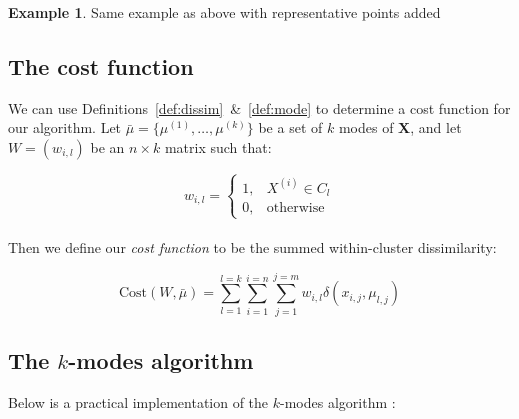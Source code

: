 \documentclass{article}
\theoremstyle{definition}
\newtheorem{example}{Example}
\begin{document}
\begin{example}
\large{Same example as above with representative points added}
\end{example}

\subsection{The cost function}\label{subsection:cost}

We can use Definitions~\ref{def:dissim}~\&~\ref{def:mode} to determine a cost 
function for our algorithm. Let \(\bar{\mu} = \{\mu^{(1)}, \ldots, \mu^{(k)}\}\) 
be a set of \(k\) modes of \textbf{X}, and let \(W = (w_{i,l})\) be an \(n 
\times k\) matrix such that:

\[ 
    w_{i,l} = \begin{cases}
                1, & X^{(i)} \in C_l \\
                0, & \text{otherwise}
              \end{cases}
\]\\

Then we define our \emph{cost function} to be the summed within-cluster 
dissimilarity:

\begin{equation}
    \text{Cost}(W, \bar{\mu}) = \sum_{l=1}^{l=k} \sum_{i=1}^{i=n} 
                                \sum_{j=1}^{j=m} w_{i,l} 
                                \delta(x_{i,j}, \mu_{l,j})
\end{equation}


\subsection{The \(k\)-modes algorithm}\label{subsection:kmodes}

Below is a practical implementation of the \(k\)-modes algorithm \cite{Huang98}:
\end{document}
